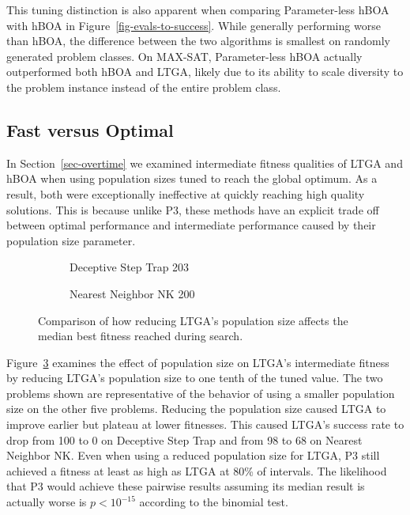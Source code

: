 This tuning distinction is also apparent when comparing Parameter-less hBOA with hBOA in Figure~\ref{fig-evals-to-success}.
While generally performing worse than hBOA, the difference between the two algorithms is smallest
on randomly generated problem classes. On MAX-SAT, Parameter-less hBOA actually outperformed both hBOA and LTGA,
likely due to its ability to scale diversity to the problem instance instead of the entire problem class.

\subsection{Fast versus Optimal}
\label{sec-fast-vs-optimal}

In Section~\ref{sec-overtime} we examined intermediate fitness qualities of LTGA and hBOA when using
population sizes tuned to reach the global optimum. As a result, both were exceptionally ineffective
at quickly reaching high quality solutions. This is because unlike P3, these methods have an explicit
trade off between optimal performance and intermediate performance caused by their population size parameter.

\begin{figure}[t]
  \begin{centering}
    \begin{subfigure}{.5\textwidth}
      \begin{centering}
      \end{centering}
      \caption{Deceptive Step Trap 203}
      \label{fig-small-pop-dst}
    \end{subfigure}%
    \begin{subfigure}{.5\textwidth}
      \begin{centering}
      \end{centering}
      \caption{Nearest Neighbor NK 200}
      \label{fig-small-pop-nk}
    \end{subfigure}
  \end{centering}
  \caption{Comparison of how reducing LTGA's population size affects
           the median best fitness reached during search.}
  \label{fig-small-pop}
\end{figure}

Figure~\ref{fig-small-pop} examines the effect of population size on LTGA's intermediate fitness by
reducing LTGA's population size to one tenth of the tuned value. The two problems shown are representative of the behavior of using
a smaller population size on the other five problems. Reducing the population size caused LTGA to improve earlier but plateau
at lower fitnesses. This caused LTGA's success rate to drop from 100 to 0 on Deceptive Step Trap and from 98 to 68 on Nearest
Neighbor NK.
Even when using a reduced population size for LTGA, P3 still achieved a fitness at
least as high as LTGA at 80\% of intervals.
The likelihood that P3 would achieve these pairwise results assuming its median result is actually worse is $p < 10^{-15}$
according to the binomial test.


